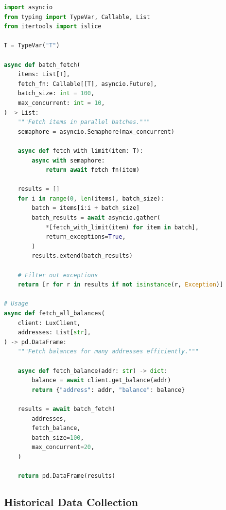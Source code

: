 \documentclass[11pt,twocolumn]{article}
\begin{document}
\begin{lstlisting}[language=Python,caption=Batch Fetching]
import asyncio
from typing import TypeVar, Callable, List
from itertools import islice

T = TypeVar("T")

async def batch_fetch(
    items: List[T],
    fetch_fn: Callable[[T], asyncio.Future],
    batch_size: int = 100,
    max_concurrent: int = 10,
) -> List:
    """Fetch items in parallel batches."""
    semaphore = asyncio.Semaphore(max_concurrent)

    async def fetch_with_limit(item: T):
        async with semaphore:
            return await fetch_fn(item)

    results = []
    for i in range(0, len(items), batch_size):
        batch = items[i:i + batch_size]
        batch_results = await asyncio.gather(
            *[fetch_with_limit(item) for item in batch],
            return_exceptions=True,
        )
        results.extend(batch_results)

    # Filter out exceptions
    return [r for r in results if not isinstance(r, Exception)]

# Usage
async def fetch_all_balances(
    client: LuxClient,
    addresses: List[str],
) -> pd.DataFrame:
    """Fetch balances for many addresses efficiently."""

    async def fetch_balance(addr: str) -> dict:
        balance = await client.get_balance(addr)
        return {"address": addr, "balance": balance}

    results = await batch_fetch(
        addresses,
        fetch_balance,
        batch_size=100,
        max_concurrent=20,
    )

    return pd.DataFrame(results)
\end{lstlisting}

\subsection{Historical Data Collection}
\end{document}
